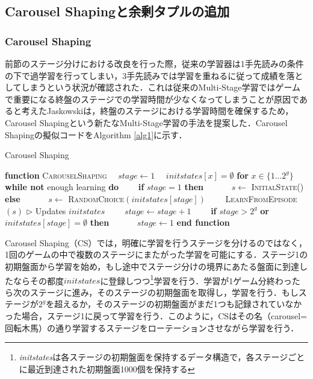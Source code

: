 \documentclass{suribt}
\begin{document}
\subsection{Carousel Shapingと余剰タプルの追加}
\subsubsection{Carousel Shaping}
前節のステージ分けにおける改良を行った際，従来の学習器は1手先読みの条件の下で過学習を行ってしまい，3手先読みでは学習を重ねるに従って成績を落としてしまうという状況が確認された．これは従来のMulti-Stage学習ではゲームで重要になる終盤のステージでの学習時間が少なくなってしまうことが原因であると考えたJaskowskiは，終盤のステージにおける学習時間を確保するため，Carousel Shapingという新たなMulti-Stage学習の手法を提案した．Carousel Shapingの擬似コードをAlgorithm \ref{alg1}に示す．

\begin{algorithm}
\caption{Carousel Shaping}
\label{alg1}
\begin{algorithmic}[1]
\STATE \textbf{function} \textsc{CarouselShaping}
\STATE 　$stage \leftarrow 1$
\STATE 　$initstates[x] = \emptyset$ \textbf{for} $x \in \{1...2^g\}$
\STATE 　\textbf{while not} enough learning \textbf{do}
\STATE 　　\textbf{if} $stage = 1$ \textbf{then}
\STATE 　　　$s \leftarrow$ \textsc{InitialState()}
\STATE 　　\textbf{else}
\STATE 　　　$s \leftarrow$ \textsc{RandomChoice}$(initstates[stage])$
\STATE 　　\textsc{LearnFromEpisode}$(s)$ $\triangleright$ Updates $initstates$
\STATE 　　$stage \leftarrow stage + 1$
\STATE 　　\textbf{if} $stage > 2^g$ \textbf{or} $initstates[stage] = \emptyset$ \textbf{then}
\STATE 　　　$stage \leftarrow 1$
\STATE \textbf{end function}
\end{algorithmic}
\end{algorithm}

Carousel Shaping（CS）では，明確に学習を行うステージを分けるのではなく，1回のゲームの中で複数のステージにまたがった学習を可能にする．ステージ1の初期盤面から学習を始め，もし途中でステージ分けの境界にあたる盤面に到達したならその都度$initstates$に登録しつつ\footnote{\textit{initstates}は各ステージの初期盤面を保持するデータ構造で，各ステージごとに最近到達された初期盤面1000個を保持する}学習を行う．学習が1ゲーム分終わったら次のステージに進み，そのステージの初期盤面を取得し，学習を行う．もしステージが$2^g$を超えるか，そのステージの初期盤面がまだ1つも記録されていなかった場合，ステージ1に戻って学習を行う．このように，CSはその名（carousel=回転木馬）の通り学習するステージをローテーションさせながら学習を行う．
\end{document}
